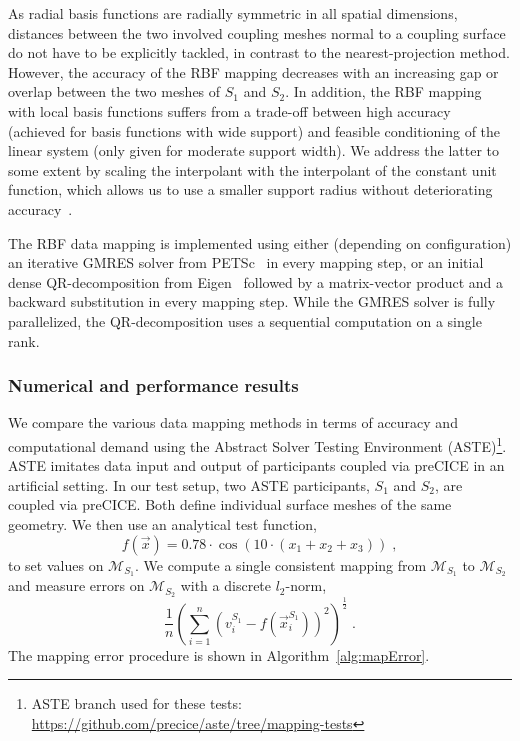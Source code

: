 As radial basis functions are radially symmetric in all spatial dimensions, distances between the two involved coupling meshes normal to a coupling surface do not have to be explicitly tackled, in contrast to the nearest-projection method. However, the accuracy of the RBF mapping decreases with an increasing gap or overlap between the two meshes of $S_1$ and $S_2$. In addition, the RBF mapping with local basis functions suffers from a trade-off between high accuracy (achieved for basis functions with wide support) and feasible conditioning of the linear system (only given for moderate support width). We address the latter to some extent by scaling the interpolant with the interpolant of the constant unit function, which allows us to use a smaller support radius without deteriorating accuracy~\cite{deparis2014rescaled, Lindner2017}.



The RBF data mapping is implemented using either (depending on configuration) an iterative GMRES solver from PETSc~\cite{petsc-user-ref} in every mapping step, or an initial dense QR-decomposition from Eigen~\cite{eigenweb} followed by a matrix-vector product and a backward substitution in every mapping step. While the GMRES solver is fully parallelized, the QR-decomposition uses a sequential computation on a single rank.


\subsubsection{Numerical and performance results}

We compare the various data mapping methods in terms of accuracy and computational demand using the Abstract Solver Testing Environment (ASTE)\footnote{ASTE branch used for these tests: \url{https://github.com/precice/aste/tree/mapping-tests}}. ASTE imitates data input and output of participants coupled via preCICE in an artificial setting. In our test setup, two ASTE participants, $S_1$ and $S_2$, are coupled via preCICE. Both define individual surface meshes of the same geometry. We then use an analytical test function,
\[
  f(\vec{x}) = 0.78 \cdot \cos \left(10 \cdot (x_1 + x_2 + x_3)\right)\;,
\]
to set values on $\mathcal{M}_{S_1}$. We compute a single consistent mapping from $\mathcal{M}_{S_1}$ to $\mathcal{M}_{S_2}$ and measure errors on $\mathcal{M}_{S_2}$ with a discrete $l_2$-norm,
\[
\frac{1}{n} \left(\sum_{i=1}^n \left(v_i^{S_1} - f(\vec{x}^{S_1}_i)\right)^2 \right)^{\frac{1}{2}}\;.    
\]
The mapping error procedure is shown in Algorithm~\ref{alg:mapError}.

